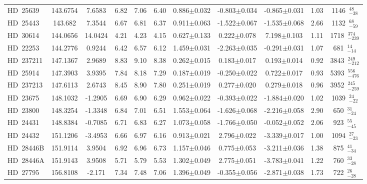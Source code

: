 {\begin{longtable}{lcccccccccc}
HD~25639 & 143.6754 & 7.6583 & 6.82 & 7.06 & 6.40 & 0.886$\pm$0.032 & -0.803$\pm$0.034 & -0.865$\pm$0.031 & 1.03 & 1146~$_{-38}^{48}$ \\
\noalign{\smallskip}
HD~25443 & 143.682 & 7.3544 & 6.67 & 6.81 & 6.37 & 0.911$\pm$0.063 & -1.522$\pm$0.067 & -1.535$\pm$0.068 & 2.66 & 1132~$_{-59}^{68}$ \\
\noalign{\smallskip}
HD~30614 & 144.0656 & 14.0424 & 4.21 & 4.23 & 4.15 & 0.627$\pm$0.133 & 0.222$\pm$0.078 & 7.198$\pm$0.103 & 1.11 & 1718~$_{-239}^{374}$ \\
\noalign{\smallskip}
HD~22253 & 144.2776 & 0.9244 & 6.42 & 6.57 & 6.12 & 1.459$\pm$0.031 & -2.263$\pm$0.035 & -0.291$\pm$0.031 & 1.07 & 681~$_{-14}^{14}$ \\
\noalign{\smallskip}
HD~237211 & 147.1367 & 2.9689 & 8.83 & 9.10 & 8.38 & 0.262$\pm$0.015 & 0.183$\pm$0.017 & 0.193$\pm$0.014 & 0.92 & 3843~$_{-212}^{249}$ \\
\noalign{\smallskip}
HD~25914 & 147.3903 & 3.9395 & 7.84 & 8.18 & 7.29 & 0.187$\pm$0.019 & -0.250$\pm$0.022 & 0.722$\pm$0.017 & 0.93 & 5393~$_{-476}^{556}$ \\
\noalign{\smallskip}
HD~237213 & 147.6113 & 2.6743 & 8.45 & 8.90 & 7.80 & 0.251$\pm$0.019 & 0.277$\pm$0.020 & 0.279$\pm$0.018 & 0.96 & 3952~$_{-259}^{245}$ \\
\noalign{\smallskip}
HD~23675 & 148.1032 & -1.2905 & 6.69 & 6.90 & 6.29 & 0.962$\pm$0.022 & -0.393$\pm$0.022 & -1.884$\pm$0.020 & 1.02 & 1039~$_{-22}^{24}$ \\
\noalign{\smallskip}
HD~23800 & 148.3254 & -1.3348 & 6.84 & 7.01 & 6.51 & 1.553$\pm$0.064 & -1.626$\pm$0.068 & -2.216$\pm$0.058 & 2.90 & 650~$_{-24}^{31}$ \\
\noalign{\smallskip}
HD~24431 & 148.8384 & -0.7085 & 6.71 & 6.83 & 6.27 & 1.073$\pm$0.058 & -1.766$\pm$0.050 & -0.052$\pm$0.052 & 2.06 & 923~$_{-45}^{55}$ \\
\noalign{\smallskip}
HD~24432 & 151.1206 & -3.4953 & 6.66 & 6.97 & 6.16 & 0.913$\pm$0.021 & 2.796$\pm$0.022 & -3.339$\pm$0.017 & 1.00 & 1094~$_{-23}^{27}$ \\
\noalign{\smallskip}
HD~28446B & 151.9114 & 3.9504 & 6.92 & 6.96 & 6.73 & 1.157$\pm$0.046 & 0.775$\pm$0.053 & -3.211$\pm$0.036 & 1.38 & 875~$_{-34}^{41}$ \\
\noalign{\smallskip}
HD~28446A & 151.9143 & 3.9508 & 5.71 & 5.79 & 5.53 & 1.302$\pm$0.049 & 2.775$\pm$0.051 & -3.783$\pm$0.041 & 1.22 & 760~$_{-28}^{33}$ \\
\noalign{\smallskip}
HD~27795 & 156.8108 & -2.171 & 7.34 & 7.48 & 7.06 & 1.396$\pm$0.049 & -0.355$\pm$0.056 & -2.871$\pm$0.038 & 1.73 & 722~$_{-28}^{26}$ \\

\end{longtable}}
